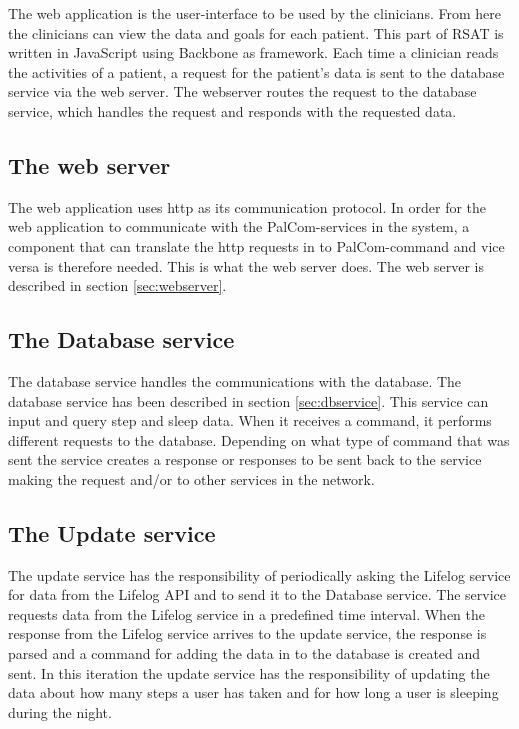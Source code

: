 \documentclass{cslthse-msc}
\begin{document}
The web application is the user-interface to be used by the clinicians. From here the clinicians can view the data and goals for each patient. This part of RSAT is written in JavaScript using Backbone as framework. Each time a clinician reads the activities of a patient, a request for the patient’s data is sent to the database service via the web server.  The webserver routes the request to the database service, which handles the request and responds with the requested data.

\subsection{The web server}

The web application uses http as its communication protocol. In order for the web application to communicate with the PalCom-services in the system, a component that can translate the http requests in to PalCom-command and vice versa is therefore needed. This is what the web server does. The web server is described in section \ref{sec:webserver}. 


\subsection{The Database service}

The database service handles the communications with the database. The database service has been described in section \ref{sec:dbservice}. This service can input and query step and sleep data. When it receives a command, it performs different requests to the database. Depending on what type of command that was sent the service creates a response or responses to be sent back to the service making the request and/or to other services in the network.

\subsection{The Update service}

The update service has the responsibility of periodically asking the Lifelog service for data from the Lifelog API and to send it to the Database service. The service requests data from the Lifelog service in a predefined time interval. When the response from the Lifelog service arrives to the update service, the response is parsed and a command for adding the data in to the database is created and sent. In this iteration the update service has the responsibility of updating the data about how many steps a user has taken and for how long a user is sleeping during the night.
\end{document}
